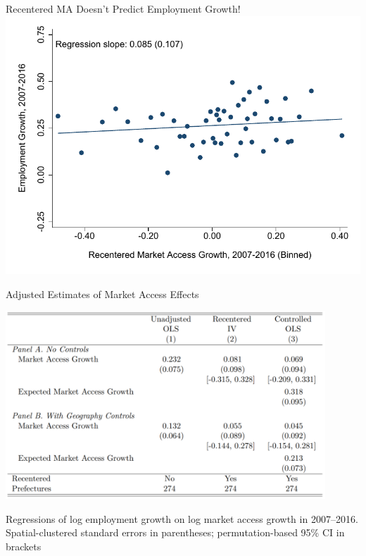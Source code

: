 \documentclass{beamer}
\begin{document}
\begin{frame}[label=HsrRcScatter]{Recentered MA Doesn't Predict Employment Growth!}
	\includegraphics[width=\textwidth]{lecture_includes/emp_rc_nlink_binscatter.pdf} 
\end{frame}

\begin{frame}[label=HSRTable]{Adjusted Estimates of Market Access Effects}
	\begin{center}
	\includegraphics[width=0.9\textwidth]{lecture_includes/hsr_tab.png}
	
	\footnotesize{Regressions of log employment growth on log market access growth in 2007--2016. Spatial-clustered standard errors in parentheses; permutation-based 95\% CI in brackets}
	\end{center}
\end{frame}
\end{document}
